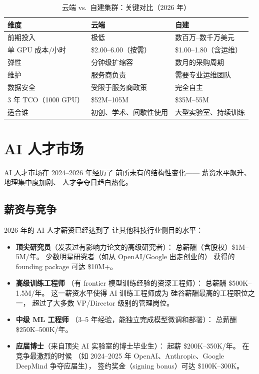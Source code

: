 \begin{table}[H]
\centering\small
\caption{云端 vs.\ 自建集群：关键对比（2026 年）}
\begin{tabularx}{\linewidth}{l X X}
\toprule
\textbf{维度} & \textbf{云端} & \textbf{自建} \\
\midrule
前期投入 & 极低 & 数百万--数千万美元 \\
单 GPU 成本/小时 & \$2.00--6.00（按需） & \$1.00--1.80（含运维） \\
弹性 & 分钟级扩缩容 & 数月的采购周期 \\
维护 & 服务商负责 & 需要专业运维团队 \\
数据安全 & 受限于服务商政策 & 完全自主 \\
3 年 TCO（1000 GPU） & \$52M--105M & \$35M--55M \\
适合谁 & 初创、学术、间歇性使用 & 大型实验室、持续训练 \\
\bottomrule
\end{tabularx}
\end{table}

\section{AI 人才市场}
\label{sec:talent-market}

AI 人才市场在 2024--2026 年经历了
前所未有的结构性变化——
薪资水平飙升、地理集中度加剧、
人才争夺日趋白热化。

\subsection{薪资与竞争}

2026 年的 AI 人才薪资已经达到了
让其他科技行业侧目的水平：

\begin{itemize}[noitemsep]
  \item \textbf{顶尖研究员}（发表过有影响力论文的高级研究者）：
        总薪酬（含股权）\$1M--5M/年。
        少数明星研究者（如从 OpenAI/Google 出走创业的）
        获得的 founding package 可达 \$10M+。
  \item \textbf{高级训练工程师}
        （有 frontier 模型训练经验的资深工程师）：
        总薪酬 \$500K--1.5M/年。
        这一薪资水平使得 AI 训练工程师成为
        硅谷薪酬最高的工程职位之一，
        超过了大多数 VP/Director 级别的管理岗位。
  \item \textbf{中级 ML 工程师}
        （3--5 年经验，能独立完成模型微调和部署）：
        总薪酬 \$250K--500K/年。
  \item \textbf{应届博士}（来自顶尖 AI 实验室的博士毕业生）：
        起薪 \$200K--350K/年。
        在竞争最激烈的时候
        （如 2024--2025 年 OpenAI、Anthropic、Google DeepMind 争夺应届生），
        签约奖金（signing bonus）可达 \$100K--300K。
\end{itemize}

